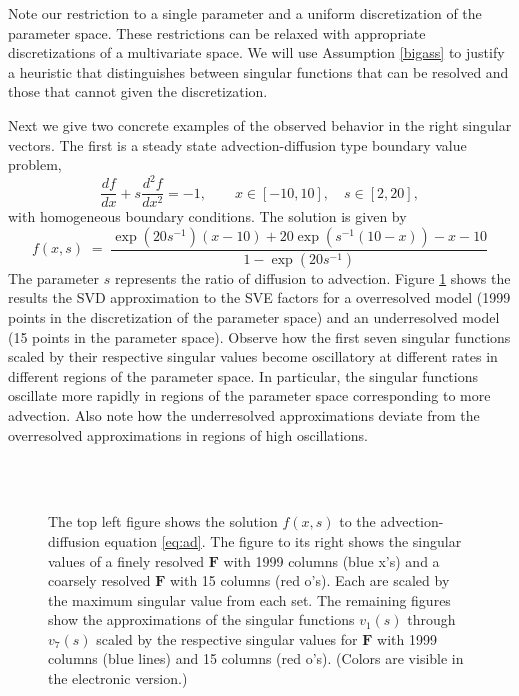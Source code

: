 \documentclass[final]{siamltex}
\providecommand{\mat}[1]{\boldsymbol{#1}}
\providecommand{\mF}{\ensuremath{\mat{F}}}
\begin{document}
Note our restriction to a single parameter and a uniform
discretization of the parameter space. These restrictions can be
relaxed with appropriate discretizations of a multivariate space.  We
will use Assumption \ref{bigass} to justify a heuristic that
distinguishes between singular functions that can be resolved and
those that cannot given the discretization.

Next we give two concrete examples of the observed behavior in the
right singular vectors. The first is a steady state
advection-diffusion type boundary value problem,
\begin{equation}
\label{eq:ad}
\frac{df}{dx} + s\frac{d^2f}{dx^2} = -1, 
\qquad x\in[-10,10],\quad s\in[2,20],
\end{equation}
with homogeneous boundary conditions. The solution is given by
\begin{equation}
f(x,s) \;=\;
\frac{\exp(20s^{-1})(x-10)+20\exp(s^{-1}(10-x))-x-10}{1-\exp(20s^{-1})}
\end{equation}
The parameter $s$ represents the ratio of diffusion to advection.
Figure \ref{fig:svecs0} shows the results the SVD approximation to the
SVE factors for a overresolved model (1999 points in the
discretization of the parameter space) and an underresolved model (15
points in the parameter space). Observe how the first seven singular
functions scaled by their respective singular values become
oscillatory at different rates in different regions of the parameter
space. In particular, the singular functions oscillate more rapidly in
regions of the parameter space corresponding to more advection. Also
note how the underresolved approximations deviate from the
overresolved approximations in regions of high oscillations.

\begin{figure}[ht]
\centering
{}\;
\;
\subfloat[$\sigma_1 v_1(s)$]{
\texttt{[image: v1-ad]}
}\\
\subfloat[$\sigma_2v_2(s)$]{
\texttt{[image: v2-ad]}
}\;
\subfloat[$\sigma_3v_3(s)$]{
\texttt{[image: v3-ad]}
}\;
\subfloat[$\sigma_4v_4(s)$]{
\texttt{[image: v4-ad]}
}\\
\subfloat[$\sigma_5v_5(s)$]{
\texttt{[image: v5-ad]}
}\;
\subfloat[$\sigma_6v_6(s)$]{
\texttt{[image: v6-ad]}
}\;
\subfloat[$\sigma_7v_7(s)$]{
\texttt{[image: v7-ad]}
}
\caption{The top left figure shows the solution $f(x,s)$ to the
  advection-diffusion equation \eqref{eq:ad}. The figure to its right
  shows the singular values of a finely resolved $\mF$ with 1999
  columns (blue x's) and a coarsely resolved $\mF$ with 15 columns
  (red o's). Each are scaled by the maximum singular value from each
  set. The remaining figures show the approximations of the singular
  functions $v_1(s)$ through $v_7(s)$ scaled by the respective
  singular values for $\mF$ with 1999 columns (blue lines) and 15
  columns (red o's). (Colors are visible in the electronic version.) }
\label{fig:svecs0}
\end{figure}
\end{document}
